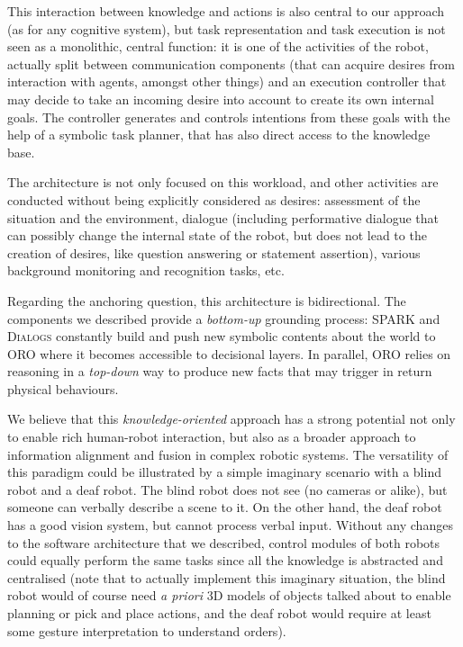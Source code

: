 \documentclass[letterpaper, 10 pt, conference]{ieeeconf}  %
\begin{document}
This interaction between knowledge and actions is also central to our approach
(as for any cognitive system), but task representation and task execution is
not seen as a monolithic, central function: it is one of the activities of the
robot, actually split between communication components (that can acquire
desires from interaction with agents, amongst other things) and an execution
controller that may decide to take an incoming desire into account to create
its own internal goals. The controller generates and controls intentions from
these goals with the help of a symbolic task planner, that has also direct
access to the knowledge base.

The architecture is not only focused on this workload, and other
activities are conducted without being explicitly considered as desires:
assessment of the situation and the environment, dialogue (including
performative dialogue that can possibly change the internal state of the robot,
but does not lead to the creation of desires,  like question answering or
statement assertion), various background monitoring and recognition tasks, etc.

Regarding the anchoring question, this architecture is bidirectional. The
components we described provide a \textit{bottom-up} grounding process: SPARK
and \textsc{Dialogs} constantly build and push new symbolic contents about the
world to ORO where it becomes accessible to decisional layers. In parallel, ORO
relies on reasoning in a \textit{top-down} way to produce new facts that may
trigger in return physical behaviours. 

We believe that this \emph{knowledge-oriented} approach has a strong potential
not only to enable rich human-robot interaction, but also as a broader approach
to information alignment and fusion in complex robotic systems.  The
versatility of this paradigm could be illustrated by a simple imaginary
scenario with a blind robot and a deaf robot. The blind robot does not see (no
cameras or alike), but someone can verbally describe a scene to it. On the
other hand, the deaf robot has a good vision system, but cannot process verbal
input.  Without any changes to the software architecture that we described,
control modules of both robots could equally perform the same tasks since all
the knowledge is abstracted and centralised (note that to actually implement
this imaginary situation, the blind robot would of course need \textit{a
priori} 3D models of objects talked about to enable planning or pick and place
actions, and the deaf robot would require at least some gesture interpretation
to understand orders).
\end{document}
